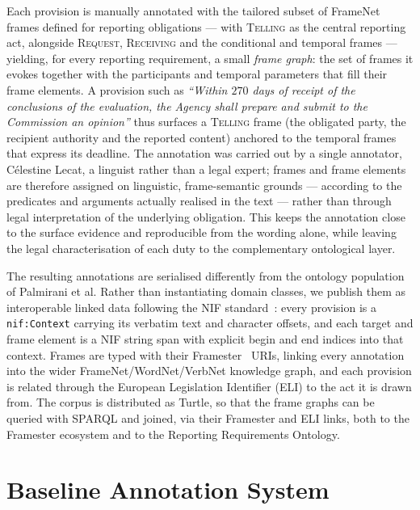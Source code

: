 \documentclass[10pt, a4paper, twocolumn]{article}
\begin{document}
Each provision is manually annotated with the tailored subset of
FrameNet~\cite{baker-etal-1998-berkeley} frames defined for reporting
obligations --- with \textsc{Telling} as the central reporting act, alongside
\textsc{Request}, \textsc{Receiving} and the conditional and temporal frames ---
yielding, for every reporting requirement, a small
\emph{frame graph}: the set of frames it evokes together with the participants
and temporal parameters that fill their frame elements. A provision such as
\textit{``Within $270$ days of receipt of the conclusions of the evaluation, the
Agency shall prepare and submit to the Commission an opinion''} thus surfaces a
\textsc{Telling} frame (the obligated party, the recipient authority and the
reported content) anchored to the temporal frames that express its deadline.
The annotation was carried out by a single annotator, Célestine Lecat, a
linguist rather than a legal expert; frames and frame elements are therefore
assigned on linguistic, frame-semantic grounds --- according to the predicates
and arguments actually realised in the text --- rather than through legal
interpretation of the underlying obligation. This keeps the annotation close to
the surface evidence and reproducible from the wording alone, while leaving the
legal characterisation of each duty to the complementary ontological layer.

The resulting annotations are serialised differently from the ontology
population of Palmirani et al. Rather than instantiating domain classes, we
publish them as interoperable linked data following the NIF
standard~\cite{hellmann2013nif}: every provision is a \texttt{nif:Context}
carrying its verbatim text and character offsets, and each target and frame
element is a NIF string span with explicit begin and end indices into that
context. Frames are typed with their Framester~\cite{gangemi2016framester} URIs,
linking every annotation into the wider FrameNet/WordNet/VerbNet knowledge graph,
and each provision is related through the European Legislation Identifier (ELI)
to the act it is drawn from. The corpus is distributed as Turtle, so that the
frame graphs can be queried with SPARQL and joined, via their Framester and ELI
links, both to the Framester ecosystem and to the Reporting Requirements
Ontology.

\section{Baseline Annotation System}
\label{sec:baseline}
\end{document}
